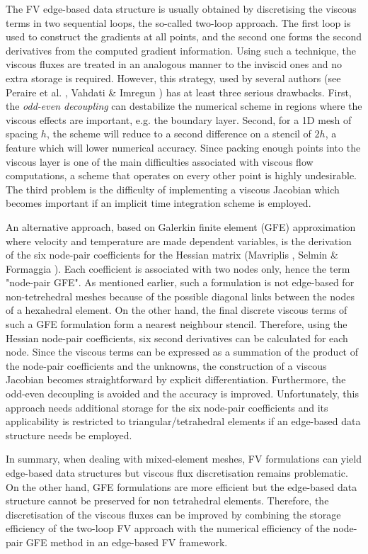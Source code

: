  The FV edge-based data structure is usually obtained by
 discretising the viscous terms in two sequential  loops, the so-called
 two-loop approach. The first loop is used to construct the gradients
 at all points, and the second one forms the second derivatives from
 the computed gradient information.
 Using such a technique, 
 the viscous fluxes are treated in an analogous manner to
 the inviscid ones and no extra storage is required.
 However, this strategy, used by several authors
 (see Peraire et al. , Vahdati \& Imregun )
 has at least three serious drawbacks.
 First, the {\em odd-even decoupling} can destabilize
 the numerical scheme in regions where the viscous effects are
 important, e.g. the boundary layer.
 Second, for a 1D mesh of spacing $h$, the scheme will reduce to a second
 difference on a stencil of $2h$, a feature which will lower numerical
 accuracy.  Since packing enough points into the viscous layer
 is one of the main difficulties associated with viscous flow
 computations, a scheme that operates on every other point is highly
 undesirable.
 The third problem is the difficulty of implementing a viscous Jacobian which
 becomes important if an implicit time integration scheme is employed.

 An alternative approach, based on Galerkin
 finite element (GFE) approximation where velocity
 and temperature are made dependent variables,  is the derivation of the six node-pair
 coefficients for the Hessian matrix (Mavriplis ,
 Selmin \& Formaggia ).
 Each coefficient  is associated with  two nodes only, hence the term "node-pair GFE". 
 As mentioned earlier, such a formulation is not edge-based for non-tetrehedral meshes because 
 of the possible diagonal links between the nodes of a hexahedral element.
 On the other hand, the final discrete viscous
 terms of such a GFE formulation form a nearest neighbour stencil.
 Therefore, using the  Hessian node-pair
 coefficients, six second derivatives can be calculated for each node.
 Since the viscous terms can be expressed as a summation of the product
 of the node-pair coefficients and the unknowns,
 the construction of a viscous Jacobian becomes straightforward by explicit
 differentiation. Furthermore, the odd-even decoupling is avoided and the accuracy is improved.
 Unfortunately, this approach needs additional storage for the six node-pair
 coefficients and its applicability is restricted to triangular/tetrahedral
 elements if an edge-based data structure needs be employed.

 In summary, when dealing with mixed-element meshes, FV formulations can
 yield edge-based data structures but viscous flux discretisation
 remains problematic. On the other hand, GFE formulations are more
 efficient but the edge-based data structure cannot be preserved for non tetrahedral elements.  
 Therefore, the discretisation of the viscous fluxes
 can be improved by combining  the
 storage efficiency of the two-loop FV approach  with the
 numerical efficiency of the node-pair GFE method in an edge-based FV framework.
